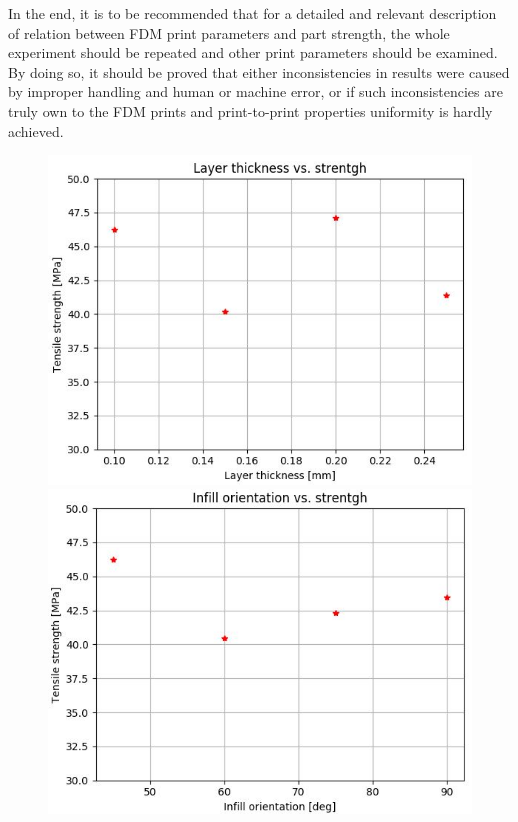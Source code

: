 \documentclass[a4paper, 11pt, reqno]{report}
\begin{document}
In the end, it is to be recommended that for a detailed and relevant description of relation between FDM print parameters and part strength, the whole experiment should be repeated and other print parameters should be examined. By doing so, it should be proved that either inconsistencies in results were caused by improper handling and human or machine error, or if such inconsistencies are truly own to the FDM prints and print-to-print properties uniformity is hardly achieved.

\begin{figure}[h]
  \centering
  \begin{minipage}[b]{0.48\textwidth}
    \includegraphics[width=\textwidth]{Graf1-2}
  \end{minipage}
  \hfill
  \begin{minipage}[b]{0.48\textwidth}
    \includegraphics[width=\textwidth]{Graf3-2}

\end{minipage}
\end{figure}
\end{document}
